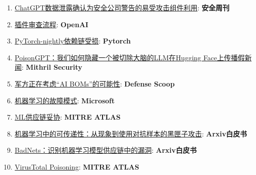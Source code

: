 \documentclass[
]{article}
\providecommand{\tightlist}{%
  \setlength{\itemsep}{0pt}\setlength{\parskip}{0pt}}
\begin{document}
\begin{enumerate}
\def\labelenumi{\arabic{enumi}.}
\tightlist
\item
  \href{https://www.securityweek.com/chatgpt-data-breach-confirmed-as-security-firm-warns-of-vulnerable-component-exploitation/}{ChatGPT数据泄露确认为安全公司警告的易受攻击组件利用}:
  \textbf{安全周刊}
\item
  \href{https://platform.openai.com/docs/plugins/review}{插件审查流程}:
  \textbf{OpenAI}
\item
  \href{https://pytorch.org/blog/compromised-nightly-dependency/}{PyTorch-nightly依赖链受损}:
  \textbf{Pytorch}
\item
  \href{https://blog.mithrilsecurity.io/poisongpt-how-we-hid-a-lobotomized-llm-on-hugging-face-to-spread-fake-news/}{PoisonGPT：我们如何隐藏一个被切除大脑的LLM在Hugging
  Face上传播假新闻}: \textbf{Mithril Security}
\item
  \href{https://defensescoop.com/2023/05/25/army-looking-at-the-possibility-of-ai-boms-bill-of-materials/}{军方正在考虑``AI
  BOMs''的可能性}: \textbf{Defense Scoop}
\item
  \href{https://learn.microsoft.com/en-us/security/engineering/failure-modes-in-machine-learning}{机器学习的故障模式}:
  \textbf{Microsoft}
\item
  \href{https://atlas.mitre.org/techniques/AML.T0010/}{ML供应链妥协}:
  \textbf{MITRE ATLAS}
\item
  \href{https://arxiv.org/pdf/1605.07277.pdf}{机器学习中的可传递性：从现象到使用对抗样本的黑匣子攻击}:
  \textbf{Arxiv白皮书}
\item
  \href{https://arxiv.org/abs/1708.06733}{BadNets：识别机器学习模型供应链中的漏洞}:
  \textbf{Arxiv白皮书}
\item
  \href{https://atlas.mitre.org/studies/AML.CS0002}{VirusTotal
  Poisoning}: \textbf{MITRE ATLAS}
\end{enumerate}
\end{document}

